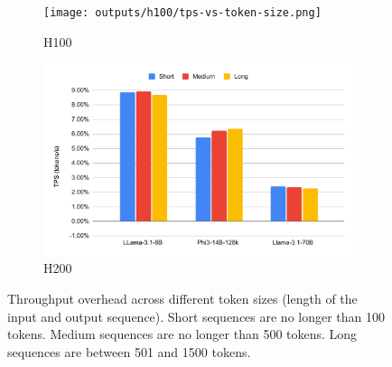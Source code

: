\documentclass{article}
\begin{document}
\begin{figure}
    \centering
    \begin{subfigure}[b]{0.49\linewidth}
        \centering
        \texttt{[image: outputs/h100/tps-vs-token-size.png]}
        \caption{H100}
        \label{fig:tps-overhead-vs-token-size-h100}
    \end{subfigure}
    \begin{subfigure}[b]{0.49\linewidth}
        \centering
        \includegraphics[width=\linewidth]{outputs/h200_1c/tps-vs-token-size.pdf}
        \caption{H200}
        \label{fig:tps-overhead-vs-token-size-h200}
    \end{subfigure}
    \caption{Throughput overhead across different token sizes (length of the input and output sequence). Short sequences are no longer than 100 tokens. Medium sequences are no longer than 500 tokens. Long sequences are between 501 and 1500 tokens.}
    \label{fig:tps-overhead-vs-token-size}
\end{figure}
\end{document}
